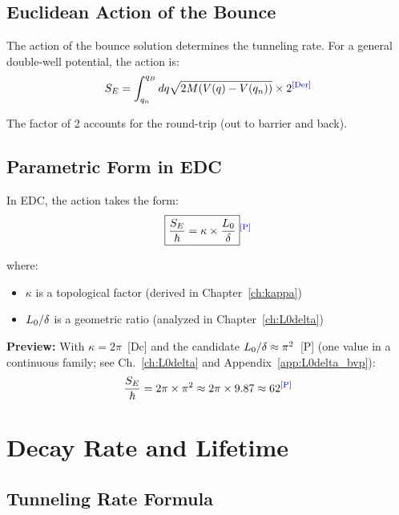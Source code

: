 \subsection{Euclidean Action of the Bounce}

The action of the bounce solution determines the tunneling rate. For a
general double-well potential, the action is:
\begin{equation}
    \SE = \int_{q_n}^{q_B} dq \sqrt{2 M (V(q) - V(q_n))} \times 2
    \label{eq:SE_wkb}
    \tagDer
\end{equation}

The factor of 2 accounts for the round-trip (out to barrier and back).

\subsection{Parametric Form in EDC}

In EDC, the action takes the form:
\begin{equation}
    \boxed{\frac{\SE}{\hbar} = \kappa \times \frac{\Lzero}{\bdelta}}
    \label{eq:SE_edc}
    \tagP
\end{equation}

where:
\begin{itemize}
    \item $\kappa$ is a topological factor (derived in Chapter~\ref{ch:kappa})
    \item $L_0/\delta$ is a geometric ratio (analyzed in Chapter~\ref{ch:L0delta})
\end{itemize}

\textbf{Preview:} With $\kappa = 2\pi$~[Dc] and the candidate
$L_0/\delta \approx \pi^2$~[P] (one value in a continuous family;
see Ch.~\ref{ch:L0delta} and Appendix~\ref{app:L0delta_bvp}):
\begin{equation}
    \frac{\SE}{\hbar} = 2\pi \times \pi^2 \approx 2\pi \times 9.87 \approx 62
    \tagP
\end{equation}

\section{Decay Rate and Lifetime}
\label{sec:instanton:rate}

\subsection{Tunneling Rate Formula}

